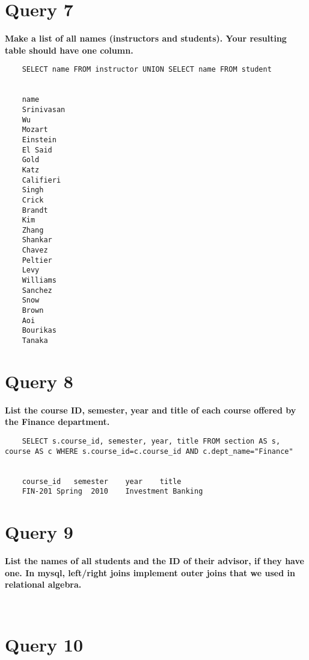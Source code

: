 \documentclass[letterpaper]{article}
\begin{document}
\section{Query 7}

    \textbf{Make a list of all names (instructors and students).  Your resulting table should have one column.}
    \begin{lstlisting}
    SELECT name FROM instructor UNION SELECT name FROM student
    
    
    name	
    Srinivasan	
    Wu	
    Mozart	
    Einstein	
    El Said	
    Gold	
    Katz	
    Califieri	
    Singh	
    Crick	
    Brandt	
    Kim	
    Zhang	
    Shankar	
    Chavez	
    Peltier	
    Levy	
    Williams	
    Sanchez	
    Snow	
    Brown	
    Aoi	
    Bourikas	
    Tanaka	       
    \end{lstlisting}
        
\section{Query 8}

    \textbf{List the course ID, semester, year and title of each course offered by the Finance department.}
    \begin{lstlisting}
    SELECT s.course_id, semester, year, title FROM section AS s, course AS c WHERE s.course_id=c.course_id AND c.dept_name="Finance"
    
    
    course_id   semester    year    title
    FIN-201	Spring	2010	Investment Banking	
    \end{lstlisting}
        
\section{Query 9}

    \textbf{List the names of all students and the ID of their advisor, if they have one.  In mysql, left/right joins implement outer joins that we used in relational algebra.}
    \begin{lstlisting}
        
    \end{lstlisting}
        
\section{Query 10}
\end{document}
